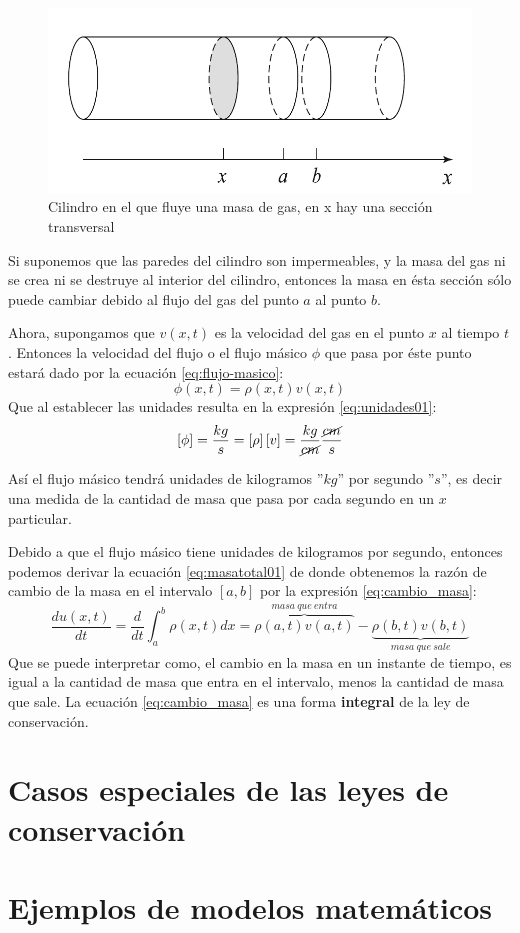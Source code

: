 \begin{figure}\label{fig:cilindro01}
    \centering
    \includegraphics[scale=0.5]{images/cilindro01.png}
    \caption{Cilindro en el que fluye una masa de gas, en x hay una sección transversal}
\end{figure}

Si suponemos que las paredes del cilindro son impermeables, y la masa del gas ni se crea ni se destruye
al interior del cilindro, entonces la masa en ésta sección sólo puede cambiar debido al flujo del gas
del punto $a$ al punto $b$.

Ahora, supongamos que $v(x,t)$ es la velocidad del gas en el punto $x$ al tiempo $t$.  Entonces la 
velocidad del flujo o el flujo másico $\phi$ que pasa por éste punto estará dado por la ecuación 
\eqref{eq:flujo-masico}:
\begin{equation}\label{eq:flujo-masico}
    \phi(x,t) = \rho(x,t)v(x,t)
\end{equation}
Que al establecer las unidades resulta en la expresión \eqref{eq:unidades01}:
\begin{equation}\label{eq:unidades01}
    \left[\phi\right]=\frac{kg}{s} = \left[\rho\right]\left[v\right]= \frac{kg}{\cancel{cm}}\frac{\cancel{cm}}{s}
\end{equation}

Así el flujo másico tendrá unidades de kilogramos ''$kg$'' por segundo ''$s$'', es decir una medida de la 
cantidad de masa que pasa por cada segundo en un $x$ particular.

Debido a que el flujo másico tiene unidades de kilogramos por segundo, entonces podemos derivar la 
ecuación \eqref{eq:masatotal01} de donde obtenemos la razón de cambio de la masa en el intervalo
$[a,b]$ por la expresión \eqref{eq:cambio_masa}:
\begin{equation}\label{eq:cambio_masa}
    \frac{d u(x,t)}{dt} = \frac{d}{dt}\int_a^b\rho(x,t)dx=\overbrace{\rho(a,t)v(a,t)}^{masa\ que\ entra}
    -\underbrace{\rho(b,t)v(b,t)}_{masa\ que\ sale}
\end{equation}
Que se puede interpretar como, el cambio en la masa en un instante de tiempo, es igual a la cantidad 
de masa que entra en el intervalo, menos la cantidad de masa que sale. La ecuación \eqref{eq:cambio_masa}
es una forma \textbf{integral} de la ley de conservación.
\section{Casos especiales de las leyes de conservación}

\section{Ejemplos de modelos matemáticos}


